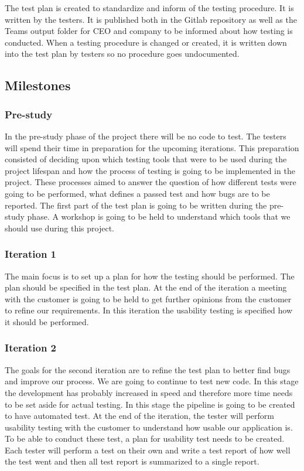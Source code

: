 \noindent The test plan is created to standardize and inform of the testing procedure. It is written by the testers. It is published both in the Gitlab repository as well as the Teams output folder for CEO and company to be informed about how testing is conducted. When a testing procedure is changed or created, it is written down into the test plan by testers so no procedure goes undocumented.

\subsection{Milestones}
\subsubsection{Pre-study}
\noindent In the pre-study phase of the project there will be no code to test. The testers will spend their time in preparation for the upcoming iterations. This preparation consisted of deciding upon which testing tools that were to be used during the project lifespan and how the process of testing is going to be implemented in the project. These processes aimed to answer the question of how different tests were going to be performed, what defines a passed test and how bugs are to be reported. The first part of the test plan is going to be written during the pre-study phase. A workshop is going to be held to understand which tools that we should use during this project. %

\subsubsection{Iteration 1}
The main focus is to set up a plan for how the testing should be performed. The plan should be specified in the test plan. At the end of the iteration a meeting with the customer is going to be held to get further opinions from the customer to refine our requirements. In this iteration the usability testing is specified how it should be performed.
\subsubsection{Iteration 2}
The goals for the second iteration are to refine the test plan to better find bugs and improve our process. We are going to continue to test new code. In this stage the development has probably increased in speed and therefore more time needs to be set aside for actual testing. In this stage the pipeline is going to be created to have automated test. At the end of the iteration, the tester will perform usability testing with the customer to understand how usable our application is. To be able to conduct these test, a plan for usability test needs to be created. Each tester will perform a test on their own and write a test report of how well the test went and then all test report is summarized to a single report.
 
